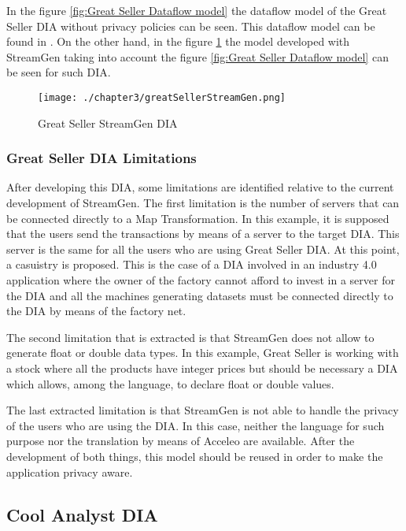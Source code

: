 In the figure \ref{fig:Great Seller Dataflow model} the dataflow model of the Great Seller DIA without privacy policies can be seen. This dataflow model can be found in \cite{privacypoliciesarticle}. On the other hand, in the figure \ref{fig:Great Seller StreamGen DIA} the model developed with StreamGen taking into account the figure \ref{fig:Great Seller Dataflow model} can be seen for such DIA.

\begin{figure}
\centering
{\texttt{[image: ./chapter3/greatSellerStreamGen.png]}}
\caption{Great Seller StreamGen DIA}
\label{fig:Great Seller StreamGen DIA}
\end{figure}

\subsubsection*{Great Seller DIA Limitations}

After developing this DIA, some limitations are identified relative to the current development of StreamGen. The first limitation is the number of servers that can be connected directly to a Map Transformation. In this example, it is supposed that the users send the transactions by means of a server to the target DIA. This server is the same for all the users who are using Great Seller DIA. At this point, a casuistry is proposed. This is the case of a DIA involved in an industry 4.0 application where the owner of the factory cannot afford to invest in a server for the DIA and all the machines generating datasets must be connected directly to the DIA by means of the factory net.

The second limitation that is extracted is that StreamGen does not allow to generate float or double data types. In this example, Great Seller is working with a stock where all the products have integer prices but should be necessary a DIA which allows, among the language, to declare float or double values.

The last extracted limitation is that StreamGen is not able to handle the privacy of the users who are using the DIA. In this case, neither the language for such purpose nor the translation by means of Acceleo are available. After the development of both things, this model should be reused in order to make the application privacy aware.

\subsection{Cool Analyst DIA}

